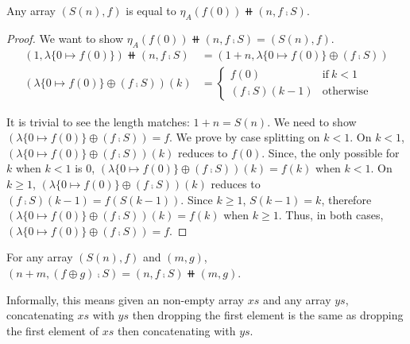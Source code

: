 \begin{lemmarep}\label{array:eta-suc}
Any array $(S(n), f)$ is equal to $\eta_A (f(0)) \doubleplus (n, f \comp S)$.
\end{lemmarep}

\begin{proof}
We want to show $\eta_A (f(0)) \doubleplus (n, f \comp S) = (S(n), f)$.
\begin{align*}
    (1, \lambda\{ 0 \mapsto f(0) \}) \doubleplus (n , f \comp S) &
    = (1 + n, \lambda\{ 0 \mapsto f(0) \} \oplus (f \comp S)) \\
    (\lambda\{ 0 \mapsto f(0) \} \oplus (f \comp S))(k) & = \begin{cases}
      f(0) & \text{if}\ k < 1 \\
      (f \comp S)(k - 1) & \text{otherwise}
    \end{cases}
\end{align*} 

It is trivial to see the length matches: $1 + n = S(n)$. We need to show 
$(\lambda\{ 0 \mapsto f(0) \} \oplus (f \comp S)) = f$.
We prove by case splitting on $k < 1$.
On $k < 1$, $(\lambda\{ 0 \mapsto f(0) \} \oplus (f \comp S))(k)$ reduces to $f(0)$.
Since, the only possible for $k$ when $k < 1$ is 0, $(\lambda\{ 0 \mapsto f(0) \} \oplus (f \comp S))(k) = f(k)$
when $k < 1$.
On $k \geq 1$, $(\lambda\{ 0 \mapsto f(0) \} \oplus (f \comp S))(k)$ reduces to $(f \comp S)(k - 1) = f(S(k - 1))$.
Since $k \geq 1$, $S(k - 1) = k$, therefore $(\lambda\{ 0 \mapsto f(0) \} \oplus (f \comp S))(k) = f(k)$
when $k \geq 1$.
Thus, in both cases, $(\lambda\{ 0 \mapsto f(0) \} \oplus (f \comp S)) = f$.
\end{proof}

\begin{lemmarep}\label{array:split}
For any array $(S(n), f)$ and $(m, g)$, $(n + m, (f \oplus g) \comp S) = (n, f \comp S) \doubleplus (m, g)$.
\end{lemmarep}

Informally, this means given an non-empty array $xs$ and any array $ys$,
concatenating $xs$ with $ys$ then dropping the first element is the same as
dropping the first element of $xs$ then concatenating with $ys$.

